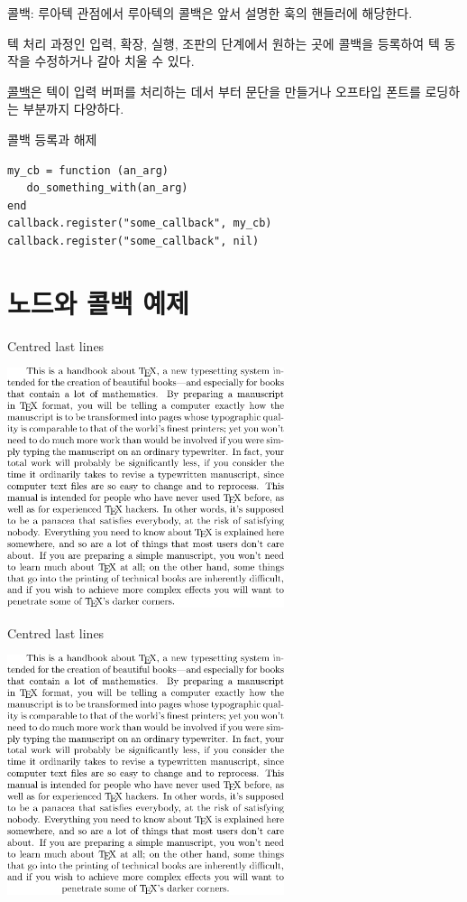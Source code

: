 \documentclass[t,10pt]{beamer}
\begin{document}
\begin{frame}[fragile]{콜백: 루아텍 관점에서}
  루아텍의 콜백은 앞서 설명한 훅의 핸들러에 해당한다.

  텍 처리 과정인 \alert{입력, 확장, 실행, 조판}의 단계에서 원하는
  곳에 콜백을 등록하여 텍 동작을 수정하거나 갈아 치울 수 있다.

  \alert{\href{http://wiki.luatex.org/index.php/Callbacks}{콜백}}은
  텍이 입력 버퍼를 처리하는 데서 부터 문단을 만들거나 오프타입 폰트를 로딩하는
  부분까지 다양하다.

  \medskip
  콜백 등록과 해제

  \begin{Verbatim}[fontsize=\small]
my_cb = function (an_arg)
   do_something_with(an_arg)
end
callback.register("some_callback", my_cb)
callback.register("some_callback", nil)
  \end{Verbatim}
\end{frame}

\section{노드와 콜백 예제}

\begin{frame}{Centred last lines}
  \begin{center}
    \includegraphics[width=3.2in]{lcenter0.pdf}
  \end{center}
\end{frame}

\begin{frame}{Centred last lines}
  \begin{center}
    \includegraphics[width=3.2in]{lcenter.pdf}
  \end{center}
\end{frame}
\end{document}
